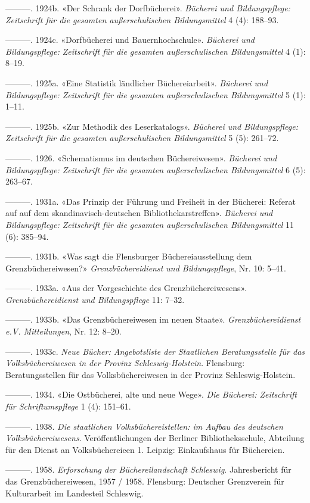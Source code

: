 \documentclass[a4paper,
fontsize=11pt,
oneside,
numbers=noperiodatend,
parskip=half-,
bibliography=totoc,
final
]{scrartcl}
\begin{document}
---------. 1924b. «Der Schrank der Dorfbücherei». \emph{Bücherei und
Bildungspflege: Zeitschrift für die gesamten außerschulischen
Bildungsmittel} 4 (4): 188--93.

---------. 1924c. «Dorfbücherei und Bauernhochschule». \emph{Bücherei
und Bildungspflege: Zeitschrift für die gesamten außerschulischen
Bildungsmittel} 4 (1): 8--19.

---------. 1925a. «Eine Statistik ländlicher Büchereiarbeit».
\emph{Bücherei und Bildungspflege: Zeitschrift für die gesamten
außerschulischen Bildungsmittel} 5 (1): 1--11.

---------. 1925b. «Zur Methodik des Leserkatalogs». \emph{Bücherei und
Bildungspflege: Zeitschrift für die gesamten außerschulischen
Bildungsmittel} 5 (5): 261--72.

---------. 1926. «Schematismus im deutschen Büchereiwesen».
\emph{Bücherei und Bildungspflege: Zeitschrift für die gesamten
außerschulischen Bildungsmittel} 6 (5): 263--67.

---------. 1931a. «Das Prinzip der Führung und Freiheit in der Bücherei:
Referat auf auf dem skandinavisch-deutschen Bibliothekarstreffen».
\emph{Bücherei und Bildungspflege: Zeitschrift für die gesamten
außerschulischen Bildungsmittel} 11 (6): 385--94.

---------. 1931b. «Was sagt die Flensburger Büchereiausstellung dem
Grenzbüchereiwesen?» \emph{Grenzbüchereidienst und Bildungspflege}, Nr.
10: 5--41.

---------. 1933a. «Aus der Vorgeschichte des Grenzbüchereiwesens».
\emph{Grenzbüchereidienst und Bildungspflege} 11: 7--32.

---------. 1933b. «Das Grenzbüchereiwesen im neuen Staate».
\emph{Grenzbüchereidienst e.V. Mitteilungen}, Nr. 12: 8--20.

---------. 1933c. \emph{Neue Bücher: Angebotsliste der Staatlichen
Beratungsstelle für das Volksbüchereiwesen in der Provinz
Schleswig-Holstein}. Flensburg: Beratungsstellen für das
Volksbüchereiwesen in der Provinz Schleswig-Holstein.

---------. 1934. «Die Ostbücherei, alte und neue Wege». \emph{Die
Bücherei: Zeitschrift für Schriftumspflege} 1 (4): 151--61.

---------. 1938. \emph{Die staatlichen Volksbüchereistellen: im Aufbau
des deutschen Volksbüchereiwesens}. Veröffentlichungen der Berliner
Bibliotheksschule, Abteilung für den Dienst an Volksbüchereieen 1.
Leipzig: Einkaufshaus für Büchereien.

---------. 1958. \emph{Erforschung der Büchereilandschaft Schleswig}.
Jahresbericht für das Grenzbüchereiwesen, 1957 / 1958. Flensburg:
Deutscher Grenzverein für Kulturarbeit im Landesteil Schleswig.
\end{document}
